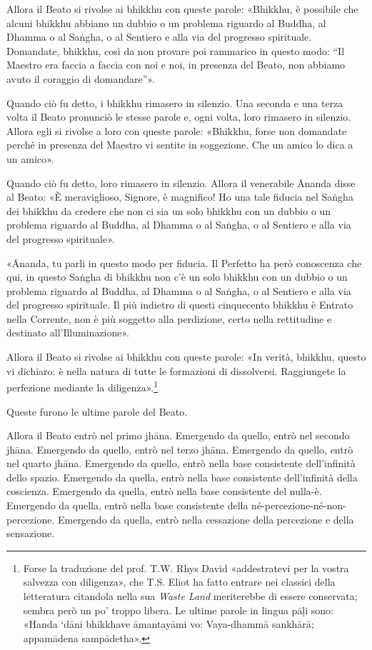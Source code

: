 
Allora il Beato si rivolse ai bhikkhu con queste parole: «Bhikkhu, è possibile
che alcuni bhikkhu abbiano un dubbio o un problema riguardo al Buddha, al Dhamma
o al Saṅgha, o al Sentiero e alla via del progresso spirituale. Domandate,
bhikkhu, così da non provare poi rammarico in questo modo: “Il Maestro era
faccia a faccia con noi e noi, in presenza del Beato, non abbiamo avuto il
coraggio di domandare”».

Quando ciò fu detto, i bhikkhu rimasero in silenzio. Una seconda e una terza
volta il Beato pronunciò le stesse parole e, ogni volta, loro rimasero in
silenzio. Allora egli si rivolse a loro con queste parole: «Bhikkhu, forse non
domandate perché in presenza del Maestro vi sentite in soggezione. Che un amico
lo dica a un amico».

Quando ciò fu detto, loro rimasero in silenzio. Allora il venerabile Ānanda
disse al Beato: «È meraviglioso, Signore, è magnifico! Ho una tale fiducia nel
Saṅgha dei bhikkhu da credere che non ci sia un solo bhikkhu con un dubbio o un
problema riguardo al Buddha, al Dhamma o al Saṅgha, o al Sentiero e alla via del
progresso spirituale».

«Ānanda, tu parli in questo modo per fiducia. Il Perfetto ha però conoscenza che
qui, in questo Saṅgha di bhikkhu non c’è un solo bhikkhu con un dubbio o un
problema riguardo al Buddha, al Dhamma o al Saṅgha, o al Sentiero e alla via del
progresso spirituale. Il più indietro di questi cinquecento bhikkhu è Entrato
nella Corrente, non è più soggetto alla perdizione, certo nella rettitudine e
destinato all’Illuminazione».

Allora il Beato si rivolse ai bhikkhu con queste parole: «In verità, bhikkhu,
questo vi dichiaro: è nella natura di tutte le formazioni di dissolversi.
Raggiungete la perfezione mediante la diligenza».\footnote{Forse la traduzione
  del prof. T.W. Rhys David «addestratevi per la vostra salvezza con diligenza»,
  che T.S. Eliot ha fatto entrare nei classici della letteratura citandola nella
  sua \emph{Waste Land} meriterebbe di essere conservata; sembra però un po’
  troppo libera. Le ultime parole in lingua pāḷi sono: «Handa ‘dāni bhikkhave
  āmantayāmi vo: Vaya-dhammā sankhārā; appamādena sampādetha».}


\label{pag364}%
Queste furono le ultime parole del Beato.

Allora il Beato entrò nel primo jhāna. Emergendo da quello, entrò nel secondo
jhāna. Emergendo da quello, entrò nel terzo jhāna. Emergendo da quello, entrò
nel quarto jhāna. Emergendo da quello, entrò nella base consistente
dell’infinità dello spazio. Emergendo da quella, entrò nella base consistente
dell’infinità della coscienza. Emergendo da quella, entrò nella base consistente
del nulla-è. Emergendo da quella, entrò nella base consistente della
né-percezione-né-non-percezione. Emergendo da quella, entrò nella cessazione
della percezione e della sensazione.

